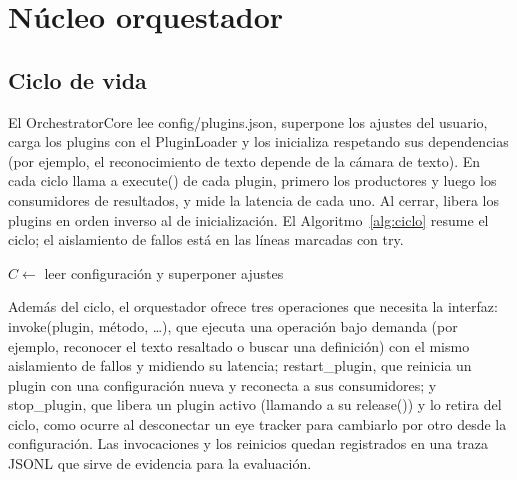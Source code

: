 \section{Núcleo orquestador}

\subsection{Ciclo de vida}

El OrchestratorCore lee config/plugins.json, superpone los ajustes del usuario, carga los plugins con el PluginLoader y los inicializa respetando sus dependencias (por ejemplo, el reconocimiento de texto depende de la cámara de texto). En cada ciclo llama a execute() de cada plugin, primero los productores y luego los consumidores de resultados, y mide la latencia de cada uno. Al cerrar, libera los plugins en orden inverso al de inicialización. El Algoritmo~\ref{alg:ciclo} resume el ciclo; el aislamiento de fallos está en las líneas marcadas con try.

\begin{algorithm}[H]
\caption{Ciclo de vida del orquestador.}
\label{alg:ciclo}
$C \leftarrow$ leer configuración y superponer ajustes\;
\end{algorithm}

Además del ciclo, el orquestador ofrece tres operaciones que necesita la interfaz: invoke(plugin, método, …), que ejecuta una operación bajo demanda (por ejemplo, reconocer el texto resaltado o buscar una definición) con el mismo aislamiento de fallos y midiendo su latencia; restart\_plugin, que reinicia un plugin con una configuración nueva y reconecta a sus consumidores; y stop\_plugin, que libera un plugin activo (llamando a su release()) y lo retira del ciclo, como ocurre al desconectar un eye tracker para cambiarlo por otro desde la configuración. Las invocaciones y los reinicios quedan registrados en una traza JSONL que sirve de evidencia para la evaluación.


